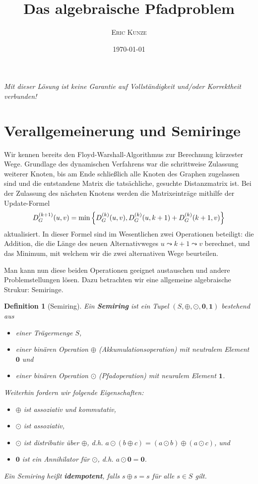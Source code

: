 \documentclass[ngerman, a4paper, 12pt]{article}
\theoremstyle{mystyle}
\newtheorem{definition}{Definition}[section]
\begin{document}
	\title{\bfseries \sffamily \huge Das algebraische Pfadproblem}
	\author{\scshape Eric Kunze}
	\date{\today}
	\maketitle
	{ \footnotesize \doclicenseThis }
	
	\begin{center}
		\small \slshape Mit dieser Lösung ist keine Garantie auf Vollständigkeit und/oder Korrektheit verbunden!
	\end{center}
	
	\section{Verallgemeinerung und Semiringe}
	
	Wir kennen bereits den Floyd-Warshall-Algorithmus zur Berechnung kürzester Wege. Grundlage des dynamischen Verfahrens war die schrittweise Zulassung weiterer Knoten, bis am Ende schließlich alle Knoten des Graphen zugelassen sind und die entstandene Matrix die tatsächliche, gesuchte Distanzmatrix ist. Bei der Zulassung des nächsten Knotens werden die Matrixeinträge mithilfe der Update-Formel 
	\begin{equation*}
		D_G^{(k+1)}(u,v)
		= \min\left\{ D_G^{(k)}(u,v) , 
				D_G^{(k)}(u,k+1) + D_G^{(k)}(k+1,v) \right\}
	\end{equation*}
	aktualisiert. In dieser Formel sind im Wesentlichen zwei Operationen beteiligt: die Addition, die die Länge des neuen Alternativweges $u \leadsto k+1 \leadsto v$ berechnet, und das Minimum, mit welchem wir die zwei alternativen Wege beurteilen.
	
	Man kann nun diese beiden Operationen geeignet austauschen und andere Problemstellungen lösen. 
	Dazu betrachten wir eine allgemeine algebraische Strukur: Semiringe.
	
	\begin{definition}[Semiring]
		Ein \textbf{Semiring} ist ein Tupel $(S, \oplus, \odot, \mathbf{0}, \mathbf{1})$ bestehend aus
		\begin{itemize}
			\item einer Trägermenge $S$,
			\item einer binären Operation $\oplus$ (Akkumulationsoperation) mit neutralem Element $\mathbf{0}$ und
			\item einer binären Operation $\odot$ (Pfadoperation) mit neuralem Element $\mathbf{1}$.
		\end{itemize}
		Weiterhin fordern wir folgende Eigenschaften:
		\begin{itemize}
			\item $\oplus$ ist assoziativ und kommutativ,
			\item $\odot$ ist assoziativ,
			\item $\odot$ ist distributiv über $\oplus$, d.h. $a \odot (b \oplus c) = (a \odot b) \oplus (a \odot c)$, und
			\item $\mathbf{0}$ ist ein Annihilator für $\odot$, d.h. $a \odot \mathbf{0} = \mathbf{0}$.
		\end{itemize}
		Ein Semiring heißt \textbf{idempotent}, falls $s \oplus s = s$ für alle $s \in S$ gilt.
	\end{definition}
\end{document}
